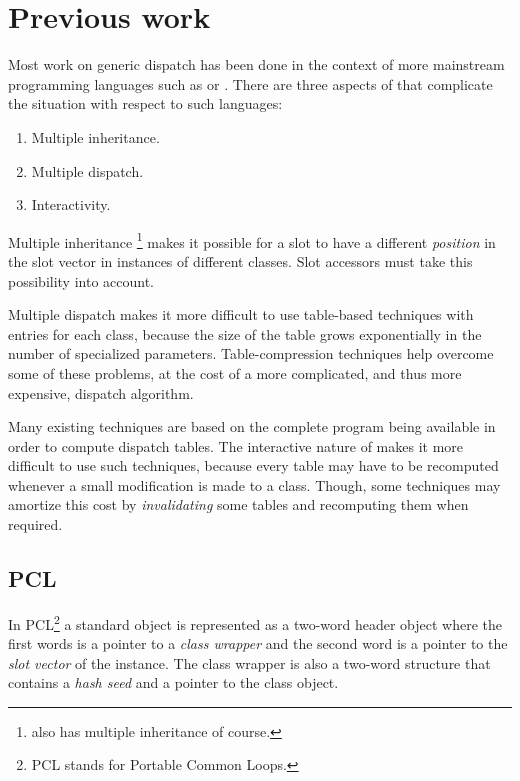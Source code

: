 \section{Previous work}

Most work on generic dispatch has been done in the context of more
mainstream programming languages such as \cplusplus{} or \java{}.
There are three aspects of \cl{} that complicate the situation with
respect to such languages:

\begin{enumerate}
\item Multiple inheritance.
\item Multiple dispatch.
\item Interactivity.
\end{enumerate}

Multiple inheritance%
\footnote{\cplusplus{} also has multiple inheritance of course.}
makes it possible for a slot to have a different \emph{position} in
the slot vector in instances of different classes.  Slot accessors
must take this possibility into account.

Multiple dispatch makes it more difficult to use table-based
techniques with entries for each class, because the size of the table
grows exponentially in the number of specialized parameters.
Table-compression techniques help overcome some of these problems, at
the cost of a more complicated, and thus more expensive, dispatch
algorithm. 

Many existing techniques are based on the complete program being
available in order to compute dispatch tables.  The interactive nature
of \cl{} makes it more difficult to use such techniques, because every
table may have to be recomputed whenever a small modification is made
to a class.  Though, some techniques may amortize this cost by
\emph{invalidating} some tables and recomputing them when required.

\subsection{PCL}

In PCL\footnote{PCL stands for Portable Common Loops.}
\cite{Kiczales:1990:EMD:91556.91600} a standard object is represented
as a two-word header object where the first words is a pointer to a
\emph{class wrapper} and the second word is a pointer to the
\emph{slot vector} of the instance.  The class wrapper is also a
two-word structure that contains a \emph{hash seed} and a pointer to
the class object. 

